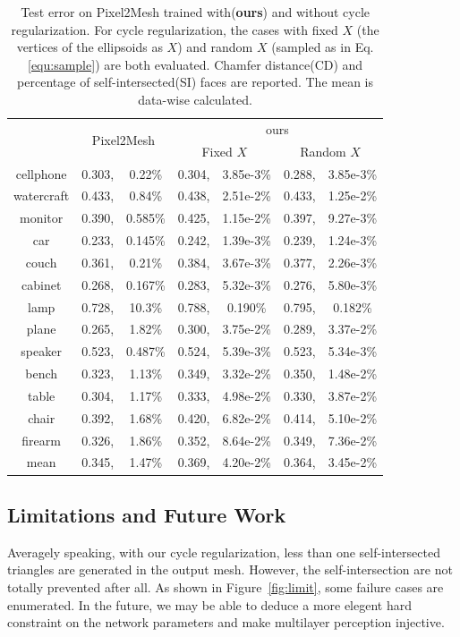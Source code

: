 \begin{table}
	\caption{Test error on Pixel2Mesh trained with(\textbf{ours}) and without cycle regularization. For cycle regularization, the cases with fixed $X$ (the vertices of the ellipsoids as $X$) and random $X$ (sampled as in Eq.\ref{equ:sample}) are both evaluated. Chamfer distance(CD) and percentage of self-intersected(SI) faces are reported. The mean is data-wise calculated.}
	\label{tab:p2m}
	\centering
	\begin{tabular}{c|rc|rc|rc|}
		\diagbox{Category}{CD,SI}{Model}&\multicolumn{2}{c|}{\multirow{2}{*}{Pixel2Mesh}}&\multicolumn{4}{c|}{ours}\\
		\cline{2-7}
		~&~&~&\multicolumn{2}{c|}{Fixed $X$}&\multicolumn{2}{c|}{Random $X$}\\
		\hline
		cellphone&0.303,&0.22\%&0.304,&3.85e-3\%&0.288,&3.85e-3\%\\
		watercraft&0.433,&0.84\%&0.438,&2.51e-2\%&0.433,&1.25e-2\%\\
		monitor&0.390,&0.585\%&0.425,&1.15e-2\%&0.397,&9.27e-3\%\\
		car&0.233,&0.145\%&0.242,&1.39e-3\%&0.239,&1.24e-3\%\\
		couch&0.361,&0.21\%&0.384,&3.67e-3\%&0.377,&2.26e-3\%\\
		cabinet&0.268,&0.167\%&0.283,&5.32e-3\%&0.276,&5.80e-3\%\\
		lamp&0.728,&10.3\%&0.788,&0.190\%&0.795,&0.182\%\\
		plane&0.265,&1.82\%&0.300,&3.75e-2\%&0.289,&3.37e-2\%\\
		speaker&0.523,&0.487\%&0.524,&5.39e-3\%&0.523,&5.34e-3\%\\
		bench&0.323,&1.13\%&0.349,&3.32e-2\%&0.350,&1.48e-2\%\\
		table&0.304,&1.17\%&0.333,&4.98e-2\%&0.330,&3.87e-2\%\\
		chair&0.392,&1.68\%&0.420,&6.82e-2\%&0.414,&5.10e-2\%\\
		firearm&0.326,&1.86\%&0.352,&8.64e-2\%&0.349,&7.36e-2\%\\
		\hline
		mean &0.345,&1.47\%&0.369,& 4.20e-2\%&0.364,& 3.45e-2\%\\
	\end{tabular}
\end{table}



\subsection{Limitations and Future Work}
Averagely speaking, with our cycle regularization, less than one self-intersected triangles are generated in the output mesh. However, the self-intersection are not totally prevented after all. As shown in Figure~\ref{fig:limit}, some failure cases are enumerated. In the future,  we may be able to deduce a more elegent hard constraint on the network parameters and make multilayer perception injective. 

